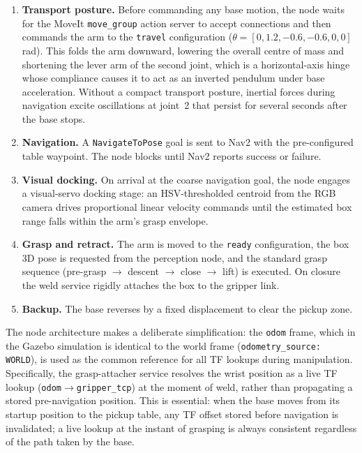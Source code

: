 \begin{enumerate}
    \item \textbf{Transport posture.} Before commanding any base motion, the node waits
    for the MoveIt \texttt{move\_group} action server to accept connections and then
    commands the arm to the \texttt{travel} configuration
    ($\theta = [0, 1.2, {-0.6}, {-0.6}, 0, 0]$\,rad). This folds the arm downward,
    lowering the overall centre of mass and shortening the lever arm of the second joint,
    which is a horizontal-axis hinge whose compliance causes it to act as an inverted
    pendulum under base acceleration. Without a compact transport posture, inertial
    forces during navigation excite oscillations at joint~2 that persist for several
    seconds after the base stops.
    \item \textbf{Navigation.} A \texttt{NavigateToPose} goal is sent to Nav2 with the
    pre-configured table waypoint. The node blocks until Nav2 reports success or failure.
    \item \textbf{Visual docking.} On arrival at the coarse navigation goal, the node
    engages a visual-servo docking stage: an HSV-thresholded centroid from the RGB
    camera drives proportional linear velocity commands until the estimated box range
    falls within the arm's grasp envelope.
    \item \textbf{Grasp and retract.} The arm is moved to the \texttt{ready}
    configuration, the box 3D pose is requested from the perception node, and the
    standard grasp sequence (pre-grasp $\to$ descent $\to$ close $\to$ lift) is
    executed. On closure the weld service rigidly attaches the box to the gripper link.
    \item \textbf{Backup.} The base reverses by a fixed displacement to clear the
    pickup zone.
\end{enumerate}

The node architecture makes a deliberate simplification: the \texttt{odom} frame, which
in the Gazebo simulation is identical to the world frame (\texttt{odometry\_source:
WORLD}), is used as the common reference for all TF lookups during manipulation.
Specifically, the grasp-attacher service resolves the wrist position as a live TF lookup
(\texttt{odom}$\to$\texttt{gripper\_tcp}) at the moment of weld, rather than propagating
a stored pre-navigation position. This is essential: when the base moves from its startup
position to the pickup table, any TF offset stored before navigation is invalidated; a
live lookup at the instant of grasping is always consistent regardless of the path
taken by the base.


